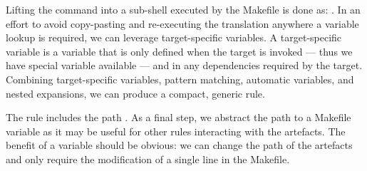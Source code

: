 {{{Lifting the  command into a sub-shell executed by the Makefile is done as: . In an effort to avoid copy-pasting and re-executing the translation anywhere a variable lookup is required, we can leverage target-specific variables. A target-specific variable is a variable that is only defined when the target is invoked --- thus we have special variable \bash{$*} available --- and in any dependencies required by the target. Combining target-specific variables, pattern matching, automatic variables, and nested expansions, we can produce a compact, generic rule.

The rule includes the path . As a final step, we abstract the path  to a Makefile variable as it may be useful for other rules interacting with the artefacts. The benefit of a variable should be obvious: we can change the path of the artefacts and only require the modification of a single line in the Makefile.




}}}
